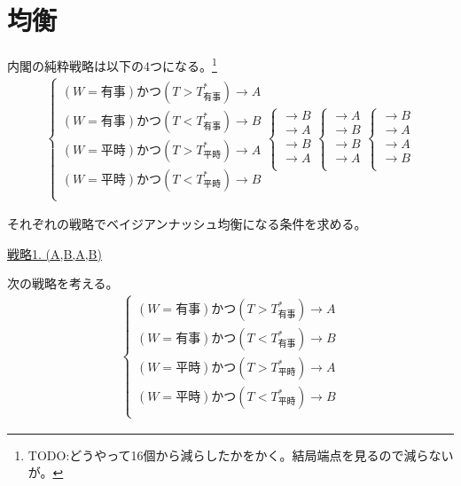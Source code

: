 \documentclass[main.tex]{subfiles}
\begin{document}
\section{均衡}

内閣の純粋戦略は以下の4つになる。\footnote{TODO:どうやって16個から減らしたかをかく。結局端点を見るので減らないが。}
\begin{align*}
    \begin{cases}
        (W=有事) かつ (T>T^*_{有事})  \rightarrow A\\
        (W=有事) かつ (T<T^*_{有事})  \rightarrow B\\
        (W=平時) かつ (T>T^*_{平時})  \rightarrow A\\
        (W=平時) かつ (T<T^*_{平時})   \rightarrow B\\
    \end{cases}
    \begin{cases}
        \rightarrow B\\
        \rightarrow A\\
        \rightarrow B\\
        \rightarrow A\\
    \end{cases}
    \begin{cases}
        \rightarrow A\\
        \rightarrow B\\
        \rightarrow B\\
        \rightarrow A\\
    \end{cases}
    \begin{cases}
        \rightarrow B\\
        \rightarrow A\\
        \rightarrow A\\
        \rightarrow B\\
    \end{cases}
\end{align*}

それぞれの戦略でベイジアンナッシュ均衡になる条件を求める。

\bigskip
\noindent
\underline{戦略1. (A,B,A,B)}

次の戦略を考える。
\begin{align*}
    \begin{cases}
        (W=有事) かつ (T>T^*_{有事})  \rightarrow A\\
        (W=有事) かつ (T<T^*_{有事})  \rightarrow B\\
        (W=平時) かつ (T>T^*_{平時})  \rightarrow A\\
        (W=平時) かつ (T<T^*_{平時})   \rightarrow B\\
    \end{cases}
\end{align*}
\end{document}
